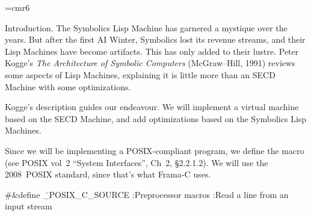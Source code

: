 


\def\topofcontents{
  \leftline{\sc\today\ at \hours}\bigskip\bigskip
  \centerline{\titlefont\title}}

\def\title{Lisp Virtual Machine}

\font\sixrm=cmr6
\def\registeredtrademark{\ooalign {\hfil \raise .07ex\hbox {\sixrm R}\hfil %
\crcr \Orb }}

\def\define#1{{\bf``#1''}}

\def\bull{\smallskip\textindent{$\bullet$}}
\def\GNU/{{\mc GNU\spacefactor1000}} %
\def\IEEE/{{\mc IEEE\spacefactor1000}} %
\def\POSIX/{{\mc POSIX\spacefactor1000}} %

\def\BSD/{{\mc BSD\spacefactor1000}} %
\def\SOLARIS/{{\rm\textsc{Solaris}\spacefactor1000}}
\def\UNIX/{{\mc U\kern-.05emNIX\spacefactor1000}}
\def\ULTRIX/{{\mc U\kern-.05emLTRIX\spacefactor1000}}
\def\macOS/{{\rm mac{\mc OS\spacefactor1000}}} %
\def\MacOSX/{{\rm Mac\,{\mc OS\,X\spacefactor1000}}} %

\def\ACSL/{{\mc ACSL\spacefactor1000}}

\def\E{=} %
\let\K=\leftarrow %





Introduction.
The Symbolics Lisp Machine has garnered a mystique over the years.
But after the first AI Winter, Symbolics lost its revenue streams, and
their Lisp Machines have become artifacts. This has only added to
their lustre. Peter Kogge's {\it The Architecture of Symbolic Computers}
(McGraw--Hill, 1991) reviews some aspects of Lisp Machines, explaining
it is little more than an SECD Machine with some optimizations.

Kogge's description guides our endeavour. We will implement a virtual
machine based on the SECD Machine, and add optimizations based on the
Symbolics Lisp Machines.

Since we will be implementing a \POSIX/-compliant program, we define
the  macro (see \POSIX/ vol~2 ``System Interfaces'',
Ch~2, \S2.2.1.2). We will use the 2008~\POSIX/ standard, since that's
what Frama-C uses.


\Y\B\8\#\&{define} \.{\_POSIX\_C\_SOURCE}\5\6
:Preprocessor macros\X\6
:Read a line from an input stream\X\par
\fi

